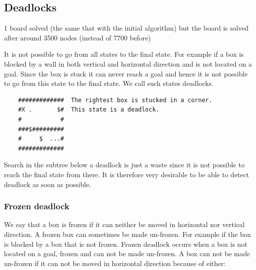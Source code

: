 \documentclass[a4paper,10pt]{article}
\begin{document}
	\subsection{Deadlocks}
	1 board solved (the same that with the initial algorithm) but the board is solved after around 3500 nodes (instead of 7700 before)

	It is not possible to go from all states to the final state.  
	For example if a box is blocked by a wall in both vertical and horizontal direction and is not located on a goal.  
	Since the box is stuck it can never reach a goal and hence it is not possible to go from this state to the final state.    
	We call such states deadlocks.

	\begin{verbatim}
	#############  The rightest box is stucked in a corner.
	#X .       $#  This state is a deadlock.
	#           # 
	###$######### 
	#     $  ...# 
	############# 
	\end{verbatim}

        Search in the subtree below a deadlock is just a waste since it is not possible to reach the final state from there.  
        It is therefore very desirable to be able to detect deadlock as soon as possible.
	  \subsubsection{Frozen deadlock}
	    We say that a box is frozen if it can neither be moved in horizontal nor vertical direction.  
	    A frozen box can sometimes be made un-frozen.  For example if the box is blocked by a box that is not frozen.  
	    Frozen deadlock occurs when a box is not located on a goal, frozen and can not be made un-frozen.  
	    A box can not be made un-frozen if it can not be moved in horizontal direction because of either:
	
\end{document}
